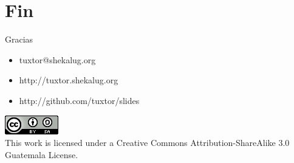 \documentclass{beamer}
\begin{document}
\section{Fin}

\begin{frame}{Gracias}
\begin{itemize}
\item tuxtor@shekalug.org
\item http://tuxtor.shekalug.org
\item http://github.com/tuxtor/slides
\end{itemize}
\begin{center}
\includegraphics[width=0.1\linewidth]{Images/cclogo}
\\
This work is licensed under a Creative Commons Attribution-ShareAlike 3.0 Guatemala License.
\end{center}
\end{frame}
\end{document}
